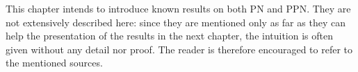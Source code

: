 This chapter intends to introduce known results on both \ac{PN} and \ac{PPN}.
They are not extensively described here:
since they are mentioned only as far as they can help the presentation of the results in the next chapter, the intuition is often given without any detail nor proof.
The reader is therefore encouraged to refer to the mentioned sources.
